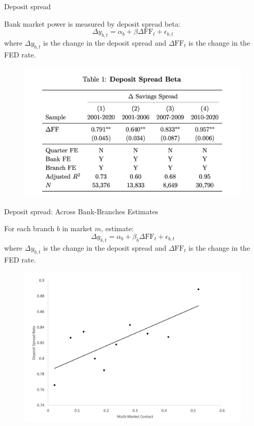 \documentclass[notes,10.2pt, aspectratio=169]{beamer}
\newenvironment{wideitemize}{\itemize\addtolength{\itemsep}{10pt}}{\enditemize}
\begin{document}
\begin{frame}{Deposit spread}
    \vspace{0.1cm}
    \begin{wideitemize}
    \item Bank market power is measured by deposit spread beta: 
    $$\Delta y_{b, t}=\alpha_b+\beta \Delta \mathrm{FF}_t+\epsilon_{b, t}$$
    where $\Delta y_{b, t}$ is the change in the deposit spread and $\Delta \mathrm{FF}_t$ is the change in the FED rate.


\begin{figure}[t*]
  \centering
  \includegraphics[width=.65\textwidth]{./imgs/table1.png}
\end{figure}



\end{wideitemize}

\end{frame}


\begin{frame}{Deposit spread: Across Bank-Branches Estimates}
  \vspace{0.1cm}
  \begin{wideitemize}
  \item For each branch $b$ in market $m$, estimate:
  $$\Delta y_{b, t}=\alpha_b+\beta_b \Delta \mathrm{FF}_t+\epsilon_{b, t}$$
  where $\Delta y_{b, t}$ is the change in the deposit spread and $\Delta \mathrm{FF}_t$ is the change in the FED rate.

  

\begin{figure}[t*]
  \centering
  \includegraphics[width=.5\textwidth]{./imgs/figure6.png}
\end{figure}



\end{wideitemize}

\end{frame}
\end{document}
